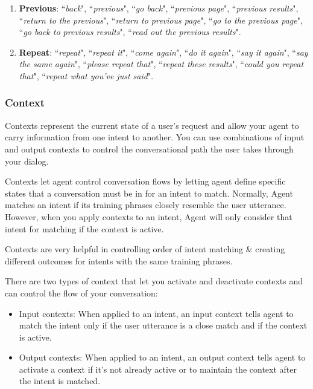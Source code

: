 \documentclass{scrreprt}
\begin{document}
\begin{enumerate}
\begin{enumerate}
        \item \textbf{Previous}: ``\textit{back}", ``\textit{previous}", ``\textit{go back}", ``\textit{previous page}", ``\textit{previous results}", ``\textit{return to the previous}", ``\textit{return to previous page}", ``\textit{go to the previous page}", ``\textit{go back to previous results}", ``\textit{read out the previous results}".
        \item \textbf{Repeat}: ``\textit{repeat}", ``\textit{repeat it}", ``\textit{come again}", ``\textit{do it again}", ``\textit{say it again}", ``\textit{say the same again}", ``\textit{please repeat that}", ``\textit{repeat these results}", ``\textit{could you repeat that}", ``\textit{repeat what you've just said}".
    \end{enumerate}
    
\end{enumerate}


\subsubsection{Context}

Contexts represent the current state of a user's request and allow your agent to carry information from one intent to another. You can use combinations of input and output contexts to control the conversational path the user takes through your dialog.

Contexts let agent control conversation flows by letting agent define specific states that a conversation must be in for an intent to match. Normally, Agent matches an intent if its training phrases closely resemble the user utterance. However, when you apply contexts to an intent, Agent will only consider that intent for matching if the context is active.

Contexts are very helpful in controlling order of intent matching \& creating different outcomes for intents with the same training phrases.

There are two types of context that let you activate and deactivate contexts and can control the flow of your conversation:

\begin{itemize}

\item Input contexts: When applied to an intent, an input context tells agent to match the intent only if the user utterance is a close match and if the context is active.
\item  Output contexts: When applied to an intent, an output context tells agent to activate a context if it's not already active or to maintain the context after the intent is matched.
\end{itemize}
\end{document}
